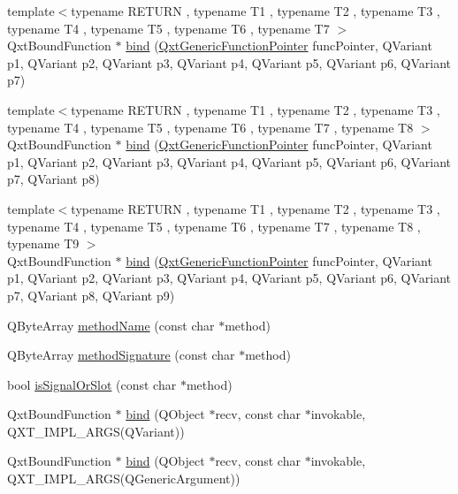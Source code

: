 \begin{DoxyCompactItemize}
\item 
{\footnotesize template$<$typename R\-E\-T\-U\-R\-N , typename T1 , typename T2 , typename T3 , typename T4 , typename T5 , typename T6 , typename T7 $>$ }\\Qxt\-Bound\-Function $\ast$ \hyperlink{namespace_qxt_meta_object_a439dfafbe6b397b2e9fc2e3e18541a3a}{bind} (\hyperlink{class_qxt_generic_function_pointer}{Qxt\-Generic\-Function\-Pointer} func\-Pointer, Q\-Variant p1, Q\-Variant p2, Q\-Variant p3, Q\-Variant p4, Q\-Variant p5, Q\-Variant p6, Q\-Variant p7)
\item 
{\footnotesize template$<$typename R\-E\-T\-U\-R\-N , typename T1 , typename T2 , typename T3 , typename T4 , typename T5 , typename T6 , typename T7 , typename T8 $>$ }\\Qxt\-Bound\-Function $\ast$ \hyperlink{namespace_qxt_meta_object_a95149eac68e6a617276ba7abda98cf08}{bind} (\hyperlink{class_qxt_generic_function_pointer}{Qxt\-Generic\-Function\-Pointer} func\-Pointer, Q\-Variant p1, Q\-Variant p2, Q\-Variant p3, Q\-Variant p4, Q\-Variant p5, Q\-Variant p6, Q\-Variant p7, Q\-Variant p8)
\item 
{\footnotesize template$<$typename R\-E\-T\-U\-R\-N , typename T1 , typename T2 , typename T3 , typename T4 , typename T5 , typename T6 , typename T7 , typename T8 , typename T9 $>$ }\\Qxt\-Bound\-Function $\ast$ \hyperlink{namespace_qxt_meta_object_a4c4dbce241d8af415f9ab2fda67032e2}{bind} (\hyperlink{class_qxt_generic_function_pointer}{Qxt\-Generic\-Function\-Pointer} func\-Pointer, Q\-Variant p1, Q\-Variant p2, Q\-Variant p3, Q\-Variant p4, Q\-Variant p5, Q\-Variant p6, Q\-Variant p7, Q\-Variant p8, Q\-Variant p9)
\item 
Q\-Byte\-Array \hyperlink{namespace_qxt_meta_object_ad5dc3f9735acfbaa57c87aa5469ddc74}{method\-Name} (const char $\ast$method)
\item 
Q\-Byte\-Array \hyperlink{namespace_qxt_meta_object_a08b2c37846aa9d2b36d93744f8b82889}{method\-Signature} (const char $\ast$method)
\item 
bool \hyperlink{namespace_qxt_meta_object_a17869c73b9170eed104ac03237395aff}{is\-Signal\-Or\-Slot} (const char $\ast$method)
\item 
Qxt\-Bound\-Function $\ast$ \hyperlink{namespace_qxt_meta_object_a204be74666ab134d66be7760e4b22633}{bind} (Q\-Object $\ast$recv, const char $\ast$invokable, Q\-X\-T\-\_\-\-I\-M\-P\-L\-\_\-A\-R\-G\-S(Q\-Variant))
\item 
Qxt\-Bound\-Function $\ast$ \hyperlink{namespace_qxt_meta_object_a7ee13711dc606b7db2b5e79bbc5373cb}{bind} (Q\-Object $\ast$recv, const char $\ast$invokable, Q\-X\-T\-\_\-\-I\-M\-P\-L\-\_\-A\-R\-G\-S(Q\-Generic\-Argument))

\end{DoxyCompactItemize}
